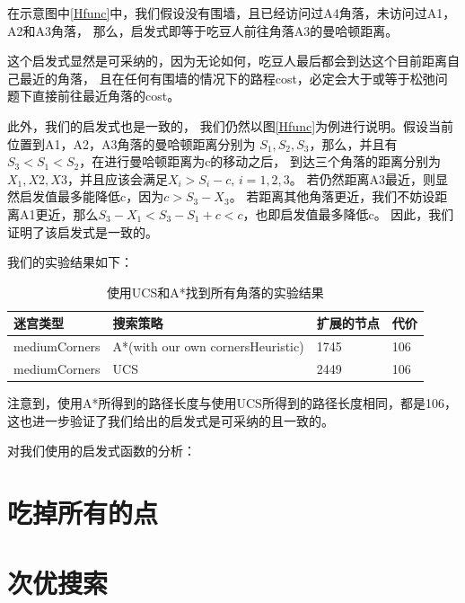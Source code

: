 \documentclass{article}
\begin{document}
在示意图中\ref{Hfunc}中，我们假设没有围墙，且已经访问过A4角落，未访问过A1，A2和A3角落，
那么，启发式即等于吃豆人前往角落A3的曼哈顿距离。

这个启发式显然是可采纳的，因为无论如何，吃豆人最后都会到达这个目前距离自己最近的角落，
且在任何有围墙的情况下的路程cost，必定会大于或等于松弛问题下直接前往最近角落的cost。

此外，我们的启发式也是一致的，
我们仍然以图\ref{Hfunc}为例进行说明。假设当前位置到A1，A2，A3角落的曼哈顿距离分别为
$S_1,S_2,S_3$，那么，并且有$S_3<S_1<S_2$，在进行曼哈顿距离为c的移动之后，
到达三个角落的距离分别为$X_1,X2,X3$，并且应该会满足$X_i>S_i-c,\, i=1,2,3$。
若仍然距离A3最近，则显然启发值最多能降低c，因为$c>S_3-X_3$。
若距离其他角落更近，我们不妨设距离A1更近，那么$S_3-X_1<S_3-S_1+c<c$，也即启发值最多降低c。
因此，我们证明了该启发式是一致的。


我们的实验结果如下：

\begin{table}[H]
	\centering
	\caption{使用UCS和A*找到所有角落的实验结果}
	\begin{tabular}{llll}
		\hline
	迷宫类型          & 搜索策略                              & 扩展的节点 & 代价  \\ \hline
	mediumCorners &  A*(with our own cornersHeuristic)    & 1745  & 106 \\
	mediumCorners & UCS & 2449  & 106 \\ \hline
	\end{tabular}
	\end{table}


注意到，使用A*所得到的路径长度与使用UCS所得到的路径长度相同，都是106，
这也进一步验证了我们给出的启发式是可采纳的且一致的。



对我们使用的启发式函数的分析：





\section{吃掉所有的点}






\section{次优搜索}
\end{document}
